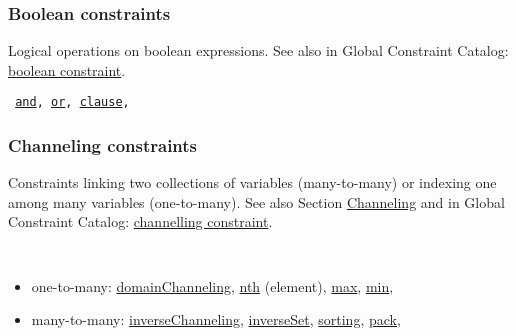 \subsubsection{Boolean constraints}\label{modelglobal:logicconstraints}\hypertarget{modelglobal:logicconstraints}{}
Logical operations on boolean expressions.
See also in Global Constraint Catalog: \href{http://www.emn.fr/x-info/sdemasse/gccat/KBoolean_constraint.html}{boolean constraint}.

\vspace{1em}\noindent\begin{notedef}\tt
\hyperlink{and:andconstraint}{and},
\hyperlink{or:orconstraint}{or},
\hyperlink{clause:clauseconstraint}{clause},
\end{notedef}

\subsubsection{Channeling constraints}\label{modelglobal:channelingconstraints}\hypertarget{modelglobal:channelingconstraints}{}
Constraints linking two collections of variables (many-to-many) or indexing one among many variables (one-to-many).
See also Section \hyperlink{model:channelingconstraints}{Channeling} and in Global Constraint Catalog: \href{http://www.emn.fr/x-info/sdemasse/gccat/Kchannelling_constraint.html}{channelling constraint}.

 \vspace{1em}\noindent\begin{notedef}\tt
   \begin{itemize}
   \item one-to-many: 
 \hyperlink{domainchanneling:domainchannelingconstraint}{domainChanneling},
 \hyperlink{nth:nthconstraint}{nth} (element),
 \hyperlink{max:maxconstraint}{max},
 \hyperlink{min:minconstraint}{min},
   \item many-to-many: 
 \hyperlink{inversechanneling:inversechannelingconstraint}{inverseChanneling},
 \hyperlink{inverseset:inversesetconstraint}{inverseSet},
 \hyperlink{sorting:sortingconstraint}{sorting},
\hyperlink{pack:packconstraint}{pack},
 \end{itemize}
 \end{notedef}

